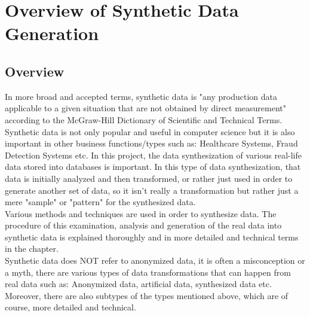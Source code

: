 \chapter{Overview of Synthetic Data Generation}
\section{Overview}
In more broad and accepted terms, synthetic data is "any production data applicable to a given situation that are not obtained by direct measurement" according to the McGraw-Hill Dictionary of Scientific and Technical Terms. \cite{McGrawSyntheticData}\\ Synthetic data is not only popular and useful in computer science but it is also important in other business functions/types such as: Healthcare Systems, Fraud Detection Systems etc. In this project, the data synthesization of various real-life data stored into databases is important. In this type of data synthesization, that data is initially analyzed and then transformed, or rather just used in order to generate another set of data, so it isn't really a transformation but rather just a mere "sample" or "pattern" for the synthesized data.\\
\newline
Various methods and techniques are used in order to synthesize data. The procedure of this examination, analysis and generation of the real data into synthetic data is explained thoroughly and in more detailed and technical terms in the  chapter.\\
Synthetic data does NOT refer to anonymized data, it is often a misconception or a myth, there are various types of data transformations that can happen from real data such as: Anonymized data, artificial data, synthesized data etc. Moreover, there are also subtypes of the types mentioned above, which are of course, more detailed and technical.
